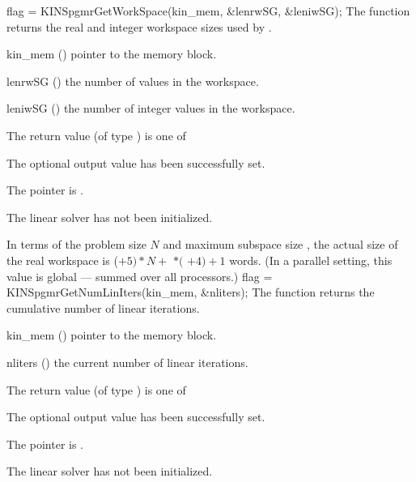 {
  flag = KINSpgmrGetWorkSpace(kin\_mem, \&lenrwSG, \&leniwSG);
}
{
  The function  returns the
  real and integer workspace sizes used by {\kinspgmr}.
}
{
  \begin{args}
  \item[kin\_mem] ()
    pointer to the {\kinsol} memory block.
  \item[lenrwSG] ()
    the number of  values in the {\kinspgmr} workspace.
  \item[leniwSG] ()
    the number of integer values in the {\kinspgmr} workspace.
  \end{args}
}
{
  The return value  (of type ) is one of
  \begin{args}
  \item[\Id{KINSPGMR\_SUCCESS}] 
    The optional output value has been successfully set.
  \item[\Id{KINSPGMR\_MEM\_NULL}]
    The  pointer is .
  \item[\Id{KINSPGMR\_LMEM\_NULL}]
    The {\kinspgmr} linear solver has not been initialized.
  \end{args}
}
{
  In terms of the problem size $N$ and maximum subspace size , 
  the actual size of the real workspace is
  ($+ 5)*N +$  $*($ $ + 4) + 1$ 
  words.  (In a parallel setting, this value is global --- summed over
  all processors.)
}
{
  flag = KINSpgmrGetNumLinIters(kin\_mem, \&nliters);
}
{
  The function  returns the
  cumulative number of linear iterations.
}
{
  \begin{args}
  \item[kin\_mem] ()
    pointer to the {\kinsol} memory block.
  \item[nliters] ()
    the current number of linear iterations.
  \end{args}
}
{
  The return value  (of type ) is one of
  \begin{args}
  \item[\Id{KINSPGMR\_SUCCESS}] 
    The optional output value has been successfully set.
  \item[\Id{KINSPGMR\_MEM\_NULL}]
    The  pointer is .
  \item[\Id{KINSPGMR\_LMEM\_NULL}]
    The {\kinspgmr} linear solver has not been initialized.
  \end{args}
}
